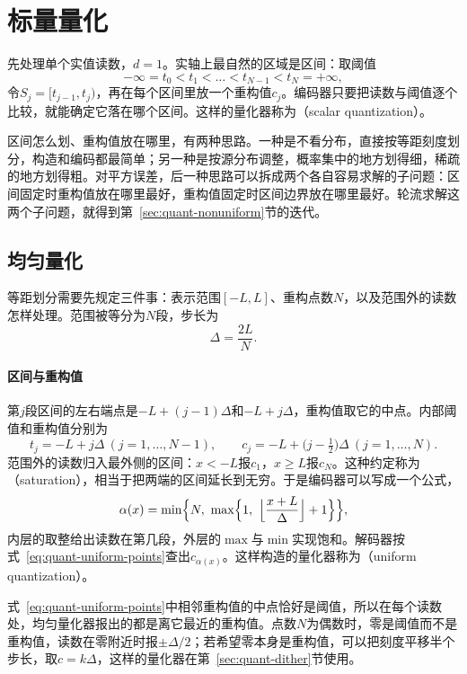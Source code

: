 \section{标量量化}
\label{sec:quant-scalar}

先处理单个实值读数，$d=1$。实轴上最自然的区域是区间：取阈值
\[
 -\infty=t_0<t_1<\dots<t_{N-1}<t_N=+\infty ,
\]
令$S_j=[t_{j-1},t_j)$，再在每个区间里放一个重构值$c_j$。编码器只要把读数与阈值逐个比较，就能确定它落在哪个区间。这样的量化器称为（scalar quantization）。

区间怎么划、重构值放在哪里，有两种思路。一种是不看分布，直接按等距刻度划分，构造和编码都最简单；另一种是按源分布调整，概率集中的地方划得细，稀疏的地方划得粗。对平方误差，后一种思路可以拆成两个各自容易求解的子问题：区间固定时重构值放在哪里最好，重构值固定时区间边界放在哪里最好。轮流求解这两个子问题，就得到第~\ref{sec:quant-nonuniform}节的迭代。

\subsection{均匀量化}
\label{sec:quant-uniform}

等距划分需要先规定三件事：表示范围$[-L,L]$、重构点数$N$，以及范围外的读数怎样处理。范围被等分为$N$段，步长为
\[
 \Delta=\frac{2L}{N} .
\]

\paragraph{区间与重构值}
第$j$段区间的左右端点是$-L+(j-1)\Delta$和$-L+j\Delta$，重构值取它的中点。内部阈值和重构值分别为
\begin{equation}
 t_j=-L+j\Delta\ (j=1,\dots,N-1),\qquad c_j=-L+\bigl(j-\tfrac12\bigr)\Delta\ (j=1,\dots,N).
 \label{eq:quant-uniform-points}
\end{equation}
范围外的读数归入最外侧的区间：$x<-L$报$c_1$，$x\geq L$报$c_N$。这种约定称为（saturation），相当于把两端的区间延长到无穷。于是编码器可以写成一个公式，
\begin{equation}
 \alpha(x)=\min\Bigl\{N,\ \max\Bigl\{1,\ \Bigl\lfloor\frac{x+L}{\Delta}\Bigr\rfloor+1\Bigr\}\Bigr\} ,
 \label{eq:quant-uniform-encoder}
\end{equation}
内层的取整给出读数在第几段，外层的$\max$与$\min$实现饱和。解码器按式~\eqref{eq:quant-uniform-points}查出$c_{\alpha(x)}$。这样构造的量化器称为（uniform quantization）。

式~\eqref{eq:quant-uniform-points}中相邻重构值的中点恰好是阈值，所以在每个读数处，均匀量化器报出的都是离它最近的重构值。点数$N$为偶数时，零是阈值而不是重构值，读数在零附近时报$\pm\Delta/2$；若希望零本身是重构值，可以把刻度平移半个步长，取$c=k\Delta$，这样的量化器在第~\ref{sec:quant-dither}节使用。

